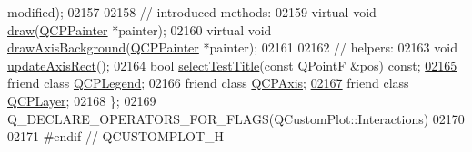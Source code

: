 \begin{DoxyCode}
      modified);
02157   
02158   \textcolor{comment}{// introduced methods:}
02159   \textcolor{keyword}{virtual} \textcolor{keywordtype}{void} \hyperlink{a00044_aecf2f7087482d4b6a78cb2770e5ed12d}{draw}(\hyperlink{a00047}{QCPPainter} *painter);
02160   \textcolor{keyword}{virtual} \textcolor{keywordtype}{void} \hyperlink{a00116_a2ddc6669cdcd1224803f78e579858b16}{drawAxisBackground}(\hyperlink{a00047}{QCPPainter} *painter);
02161   
02162   \textcolor{comment}{// helpers:}
02163   \textcolor{keywordtype}{void} \hyperlink{a00116_a428242419d3a1b63f2cbff637986c35c}{updateAxisRect}();
02164   \textcolor{keywordtype}{bool} \hyperlink{a00116_a2a2d01a092840ac01b16104f7973f831}{selectTestTitle}(\textcolor{keyword}{const} QPointF &pos) \textcolor{keyword}{const};
\hypertarget{a00116_source_l02165}{}\hyperlink{a00116_a8429035e7adfbd7f05805a6530ad5e3b}{02165}   \textcolor{keyword}{friend} \textcolor{keyword}{class }\hyperlink{a00045}{QCPLegend};
02166   \textcolor{keyword}{friend} \textcolor{keyword}{class }\hyperlink{a00025}{QCPAxis};
\hypertarget{a00116_source_l02167}{}\hyperlink{a00116_a5dbf96bf7664c1b6fce49063eeea6eef}{02167}   \textcolor{keyword}{friend} \textcolor{keyword}{class }\hyperlink{a00043}{QCPLayer};
02168 \};
02169 Q\_DECLARE\_OPERATORS\_FOR\_FLAGS(QCustomPlot::Interactions)
02170 
02171 \textcolor{preprocessor}{#endif // QCUSTOMPLOT\_H}
\end{DoxyCode}
